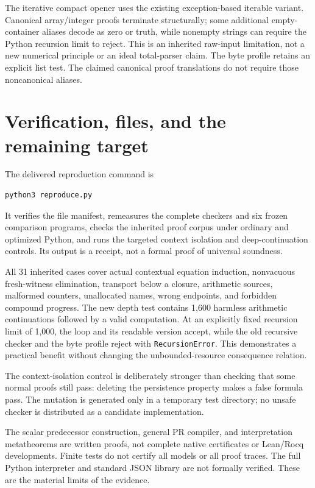 \documentclass[11pt,letterpaper]{article}
\theoremstyle{definition}\newtheorem{definition}[theorem]{Definition}
\theoremstyle{remark}\newtheorem{remark}[theorem]{Remark}
\newcommand{\file}[1]{{\small\nolinkurl{#1}}}
\begin{document}
The iterative compact opener uses the existing exception-based
iterable variant. Canonical array/integer proofs terminate
structurally; some additional empty-container aliases decode as
zero or truth, while nonempty strings can require the Python
recursion limit to reject. This is an inherited raw-input limitation,
not a new numerical principle or an ideal total-parser claim.
The byte profile retains an explicit list test. The claimed
canonical proof translations do not require those noncanonical aliases.

\section{Verification, files, and the remaining target}
\label{sec:verification}

The delivered reproduction command is
\begin{lstlisting}
python3 reproduce.py
\end{lstlisting}
It verifies the file manifest, remeasures the complete checkers and
six frozen comparison programs, checks the inherited proof corpus
under ordinary and optimized Python, and runs the targeted context
isolation and deep-continuation controls. Its output is a receipt,
not a formal proof of universal soundness.

All 31 inherited cases cover actual contextual equation induction,
nonvacuous fresh-witness elimination, transport below a closure,
arithmetic sources, malformed counters, unallocated names, wrong
endpoints, and forbidden compound progress. The new depth test
contains 1,600 harmless arithmetic continuations followed by a
valid computation. At an explicitly fixed recursion limit of 1,000,
the loop and its readable version accept, while the old recursive
checker and the byte profile reject with \file{RecursionError}.
This demonstrates a practical benefit without changing the
unbounded-resource consequence relation.

The context-isolation control is deliberately stronger than checking
that some normal proofs still pass: deleting the persistence
property makes a false formula pass. The mutation is generated only
in a temporary test directory; no unsafe checker is distributed as
a candidate implementation.

The scalar predecessor construction, general PR compiler, and
interpretation metatheorems are written proofs, not complete native
certificates or Lean/Rocq developments. Finite tests do not certify
all models or all proof traces. The full Python interpreter and
standard JSON library are not formally verified. These are the
material limits of the evidence.
\end{document}
